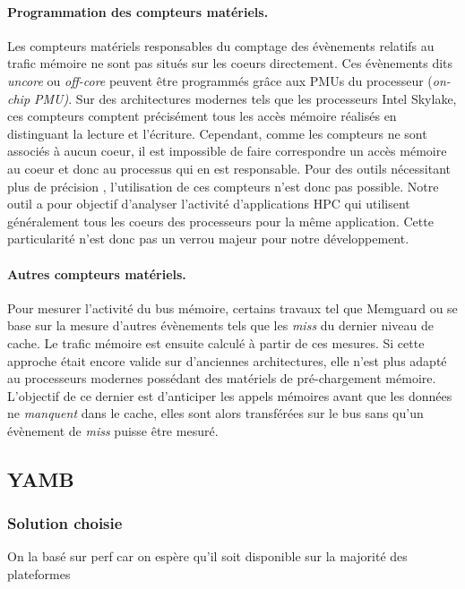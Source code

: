     \paragraph{Programmation des compteurs matériels.} Les compteurs matériels responsables du comptage des évènements relatifs au trafic mémoire ne sont pas situés sur les coeurs directement. Ces évènements dits \textit{uncore} ou \textit{off-core} peuvent être programmés grâce aux PMUs du processeur (\textit{on-chip PMU)}. Sur des architectures modernes tels que les processeurs Intel Skylake, ces compteurs comptent précisément tous les accès mémoire réalisés en distinguant la lecture et  l'écriture. Cependant, comme les compteurs ne sont associés à aucun coeur, il est impossible de faire correspondre un accès mémoire au coeur et donc au processus qui en est responsable. Pour des outils nécessitant plus de précision \cite{Larysch2016a}, l'utilisation de ces compteurs n'est donc pas possible. Notre outil a pour objectif d'analyser l'activité d'applications HPC qui utilisent généralement tous les coeurs des processeurs pour la même application. Cette particularité n'est donc pas un verrou majeur pour notre développement. 

    \paragraph{Autres compteurs matériels.} Pour mesurer l'activité du bus mémoire, certains travaux tel que Memguard \cite{Yun2013} ou \cite{Bellosa1997} se base sur la mesure d'autres évènements tels que les \textit{miss} du dernier niveau de cache. Le trafic mémoire est ensuite calculé à partir de ces mesures. Si cette approche était encore valide sur d'anciennes architectures, elle n'est plus adapté au processeurs modernes possédant des matériels de pré-chargement mémoire. L'objectif de ce dernier est d'anticiper les appels mémoires avant que les données ne \textit{manquent} dans le cache, elles sont alors transférées sur le bus sans qu'un évènement de \textit{miss} puisse être mesuré.

    

    

\subsection{YAMB}


        \subsubsection{Solution choisie}
            On la basé sur perf car on espère qu’il soit disponible sur la majorité des plateformes
            

